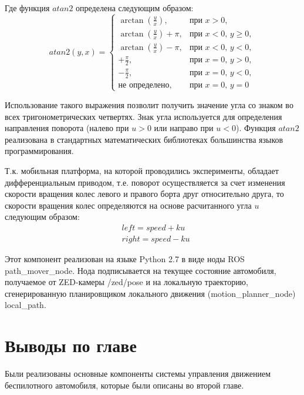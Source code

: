 Где функция $atan2$ определена следующим образом:
\begin{equation}
    atan2(y,x) =
        \begin{cases}
            \arctan(\frac{y}{x}),       & \text{при $x > 0$}, \\
            \arctan(\frac{y}{x}) + \pi, & \text{при $x < 0$, $y \geq 0$}, \\
            \arctan(\frac{y}{x}) - \pi, & \text{при $x < 0$, $y < 0$}, \\
            +\frac{\pi}{2},             & \text{при $x = 0$, $y > 0$}, \\
            -\frac{\pi}{2},             & \text{при $x = 0$, $y < 0$}, \\
            \text{не определено},       & \text{при $x = 0$, $y = 0$}
        \end{cases}
\end{equation}

Использование такого выражения позволит получить значение угла со знаком во всех тригонометрических четвертях.
Знак угла используется для определения направления поворота (налево при $u > 0$ или направо при $u < 0$). Функция $atan2$ реализована в
стандартных математических библиотеках большинства языков программирования.

Т.к. мобильная платформа, на которой проводились эксперименты, обладает дифференциальным приводом, т.е. поворот
осуществляется за счет изменения скорости вращения колес левого и правого борта друг относительно друга, то
скорости вращения колес определяются на основе расчитанного угла $u$
следующим образом:
\begin{align}
    &left = speed + ku \\
    &right = speed - ku
\end{align}

Этот компонент реализован на языке Python 2.7 в виде ноды ROS path\_mover\_node. Нода подписывается на текущее состояние
автомобиля, получаемое от ZED-камеры /zed/pose и на локальную траекторию, сгенерированную планировщиком локального
движения (motion\_planner\_node) local\_path.

\section{Выводы по главе}

Были реализованы основные компоненты системы управления движением беспилотного автомобиля, которые были описаны
во второй главе.

